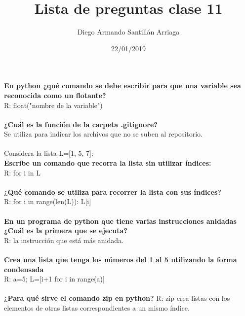 \documentclass[letter paper, 12pt, oneside]{article}
\title{\Huge Lista de preguntas clase 11}
\author{Diego Armando Santillán Arriaga}
\date{22/01/2019}
\begin{document}
	\maketitle
	\newpage
	\textbf{En python ¿qué comando se debe escribir para que una variable sea reconocida como un flotante?}
	\\
	R: float("nombre de la variable")
	\\\\
	\textbf{¿Cuál es la función de la carpeta .gitignore?}
	\\
	Se utiliza para indicar los archivos que no se suben al repositorio.
	\\\\
	Considera la lista L=[1, 5, 7]:
	\\
	\textbf{Escribe un comando que recorra la lista sin utilizar índices:}
	\\
	R: for i in L
	\\\\
	\textbf{¿Qué comando se utiliza para recorrer la lista con sus índices?}
	\\ 
	R: for i in range(len(L)):
	L[i]
	\\\\
	\textbf{En un programa de python que tiene varias instrucciones anidadas ¿Cuál es la primera que se ejecuta?}
	\\
	R: la instrucción que está más anidada. 
	\\\\
	\textbf{Crea una lista que tenga los números del 1 al 5 utilizando la forma condensada}
	\\
	R: a=5; L=[i+1 for i in range(a)]
	\\\\
	\textbf{¿Para qué sirve el comando zip en python?}
	R: zip crea listas con los elementos de otras listas correspondientes a un mismo índice. 
	
\end{document}
